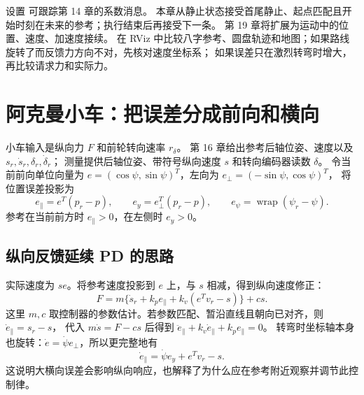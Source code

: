 设置  可跟踪第 14 章的系数消息。
本章从静止状态接受首尾静止、起点匹配且开始时刻在未来的参考；执行结束后再接受下一条。
第 19 章将扩展为运动中的位置、速度、加速度接续。
在 RViz 中比较八字参考、圆盘轨迹和地图；如果路线旋转了而反馈力方向不对，先核对速度坐标系；
如果误差只在激烈转弯时增大，再比较请求力和实际力。

\clearpage
\section{阿克曼小车：把误差分成前向和横向}\label{sec:acktrack}
小车输入是纵向力 $F$ 和前轮转向速率 $r_\delta$。
第 16 章给出参考后轴位姿、速度以及 $s_r,\dot s_r,\delta_r,\dot\delta_r$；
测量提供后轴位姿、带符号纵向速度 $s$ 和转向编码器读数 $\delta$。
令当前前向单位向量为 $e=(\cos\psi,\sin\psi)^T$，左向为 $e_\perp=(-\sin\psi,\cos\psi)^T$，
将位置误差投影为
\[
 e_\parallel=e^T(p_r-p),\qquad e_y=e_\perp^T(p_r-p),\qquad e_\psi=\operatorname{wrap}(\psi_r-\psi).
\]
参考在当前前方时 $e_\parallel>0$，在左侧时 $e_y>0$。

\begin{center}\begin{minipage}{\linewidth}\makeatletter{}\makeatother
\centering
{}
\caption{在当前车身方向上分解误差。两坐标轴比例相同；正转角使前进中的小车向左转。}
\end{minipage}\end{center}

\subsection{纵向反馈延续 PD 的思路}
实际速度为 $se$。将参考速度投影到 $e$ 上，与 $s$ 相减，得到纵向速度修正：
\begin{equation}
 F=m\{\dot s_r+k_pe_\parallel+k_v(e^Tv_r-s)\}+cs.\label{eq:ackforce}
\end{equation}
这里 $m,c$ 取控制器的参数估计。若参数匹配、暂沿直线且朝向已对齐，则 $\dot e_\parallel=s_r-s$，
代入 $m\dot s=F-cs$ 后得到 $\ddot e_\parallel+k_v\dot e_\parallel+k_pe_\parallel=0$。
转弯时坐标轴本身也旋转：$\dot e=\dot\psi e_\perp$，所以更完整地有
\[
 \dot e_\parallel=\dot\psi e_y+e^Tv_r-s.
\]
这说明大横向误差会影响纵向响应，也解释了为什么应在参考附近观察并调节此控制律。


